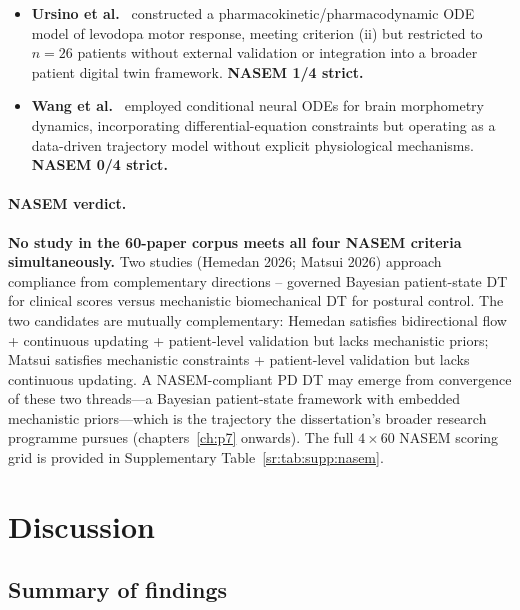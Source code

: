 \begin{itemize}
    \item \textbf{Ursino et al.}~\cite{ursino2020} constructed a pharmacokinetic/pharmacodynamic ODE model of levodopa motor response, meeting criterion (ii) but restricted to $n=26$ patients without external validation or integration into a broader patient digital twin framework. \textbf{NASEM 1/4 strict.}

    \item \textbf{Wang et al.}~\cite{wang2025} employed conditional neural ODEs for brain morphometry dynamics, incorporating differential-equation constraints but operating as a data-driven trajectory model without explicit physiological mechanisms. \textbf{NASEM 0/4 strict.}
\end{itemize}

\paragraph{NASEM verdict.}
\textbf{No study in the 60-paper corpus meets all four NASEM criteria simultaneously.} Two studies (Hemedan 2026; Matsui 2026) approach compliance from complementary directions -- governed Bayesian patient-state DT for clinical scores versus mechanistic biomechanical DT for postural control. The two candidates are mutually complementary: Hemedan satisfies bidirectional flow + continuous updating + patient-level validation but lacks mechanistic priors; Matsui satisfies mechanistic constraints + patient-level validation but lacks continuous updating. A NASEM-compliant PD DT may emerge from convergence of these two threads---a Bayesian patient-state framework with embedded mechanistic priors---which is the trajectory the dissertation's broader research programme pursues (chapters~\ref{ch:p7} onwards). The full $4 \times 60$ NASEM scoring grid is provided in Supplementary Table~\ref{sr:tab:supp:nasem}.

\section{Discussion}
\label{sr:sec:discussion}

\subsection{Summary of findings}
\label{sr:sec:discussion:summary}

